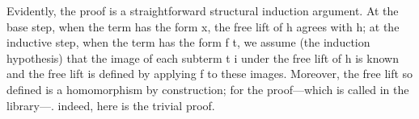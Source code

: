 \fi
Evidently, the proof is a straightforward structural induction argument.
\ifshort\else
At the base step, when the term has the form 
\ab x, the free lift of \ab h agrees with \ab h; at the inductive step, when the
term has the form  \ab f \ab t, we assume (the induction hypothesis)
that the image of each subterm \ab t \ab i under the free lift of \ab h is known
and the free lift is defined by applying \ab f   to these images.
\fi
Moreover, the free lift so defined is a homomorphism by construction;
\ifshort
for the proof---which is called  in the \agdaalgebras library---\seeshort.
\else
indeed, here is the trivial proof.

\begin{code}%
\>[0]\<%
\\
\>[0][@{}l@{\AgdaIndent{1}}]%
\>[1]\AgdaSpace{}%
\AgdaSymbol{:}\AgdaSpace{}%
\AgdaSpace{}%
\AgdaSymbol{(}\AgdaSpace{}%
\AgdaSymbol{)}\AgdaSpace{}%
\<%
\\
%
\>[1]\AgdaSpace{}%
\AgdaSymbol{=}\AgdaSpace{}%
\AgdaSpace{}%
\AgdaOperator{\AgdaInductiveConstructor{,}}\AgdaSpace{}%
\<%
\\
\>[1][@{}l@{\AgdaIndent{0}}]%
\>[2]\<%
\\
%
\>[2]\AgdaSpace{}%
\AgdaSymbol{:}\AgdaSpace{}%
\AgdaOperator{\AgdaFunction{𝔻[}}\AgdaSpace{}%
\AgdaSpace{}%
\AgdaSpace{}%
\AgdaOperator{\AgdaFunction{]}}\AgdaSpace{}%
\AgdaSpace{}%
\AgdaOperator{\AgdaFunction{𝔻[}}\AgdaSpace{}%
\AgdaSpace{}%
\AgdaOperator{\AgdaFunction{]}}\<%
\\
%
\>[2]\AgdaSpace{}%
\AgdaSymbol{=}\AgdaSpace{}%
\<%
\\
%
\\[\AgdaEmptyExtraSkip]%
%
\>[2]\AgdaSpace{}%
\AgdaSymbol{:}\AgdaSpace{}%
\AgdaSpace{}%
\AgdaSymbol{(}\AgdaSpace{}%
\AgdaSymbol{)}\AgdaSpace{}%
\AgdaSpace{}%
\<%
\\
%
\>[2]\AgdaSpace{}%
\AgdaSymbol{\{}\AgdaSymbol{\}\{}\AgdaSymbol{\}}\AgdaSpace{}%
\AgdaSymbol{=}\AgdaSpace{}%
\AgdaSpace{}%
\AgdaSymbol{(}\AgdaSpace{}%
\AgdaSymbol{)}\AgdaSpace{}%

\end{code}
